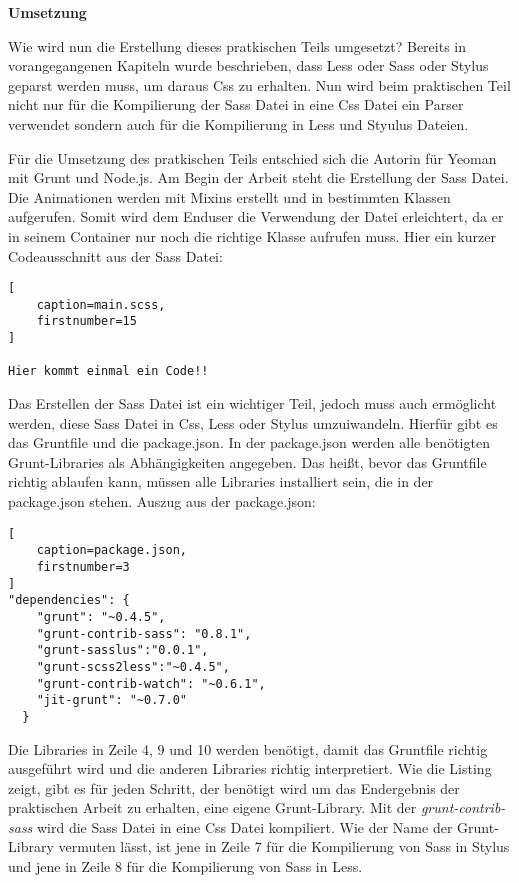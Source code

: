 \textbf{Umsetzung}

Wie wird nun die Erstellung dieses pratkischen Teils umgesetzt? \newline
Bereits in vorangegangenen Kapiteln wurde beschrieben, dass Less oder Sass oder Stylus geparst werden muss, um daraus Css zu erhalten. Nun wird beim praktischen Teil nicht nur für die Kompilierung der Sass Datei in eine Css Datei ein Parser verwendet sondern auch für die Kompilierung in Less und Styulus Dateien.

Für die Umsetzung des pratkischen Teils entschied sich die Autorin für Yeoman mit Grunt und Node.js.\newline
Am Begin der Arbeit steht die Erstellung der Sass Datei. Die Animationen werden mit Mixins erstellt und in bestimmten Klassen aufgerufen. Somit wird dem Enduser die Verwendung der Datei erleichtert, da er in seinem Container nur noch die richtige Klasse aufrufen muss.
Hier ein kurzer Codeausschnitt aus der Sass Datei:
\begin{lstlisting}[
	caption=main.scss,
	firstnumber=15
]

Hier kommt einmal ein Code!!

\end{lstlisting}
Das Erstellen der Sass Datei ist ein wichtiger Teil, jedoch muss auch ermöglicht werden, diese Sass Datei in Css, Less oder Stylus umzuiwandeln. Hierfür gibt es das Gruntfile und die package.json.
In der package.json werden alle benötigten Grunt-Libraries als Abhängigkeiten angegeben. Das heißt, bevor das Gruntfile richtig ablaufen kann, müssen alle Libraries installiert sein, die in der package.json stehen.\newline
Auszug aus der package.json:
\begin{lstlisting}[
	caption=package.json,
	firstnumber=3
]
"dependencies": {
    "grunt": "~0.4.5",
    "grunt-contrib-sass": "0.8.1",
    "grunt-sasslus":"0.0.1",
    "grunt-scss2less":"~0.4.5",
    "grunt-contrib-watch": "~0.6.1",
    "jit-grunt": "~0.7.0"
  }
\end{lstlisting}
Die Libraries in Zeile 4, 9 und 10 werden benötigt, damit das Gruntfile richtig ausgeführt wird und die anderen Libraries richtig interpretiert.
Wie die Listing zeigt, gibt es für jeden Schritt, der benötigt wird um das Endergebnis der praktischen Arbeit zu erhalten, eine eigene Grunt-Library. Mit der \textit{grunt-contrib-sass} wird die Sass Datei in eine Css Datei kompiliert. \newline
Wie der Name der Grunt-Library vermuten lässt, ist jene in Zeile 7 für die Kompilierung von Sass in Stylus und jene in Zeile 8 für die Kompilierung von Sass in Less.
